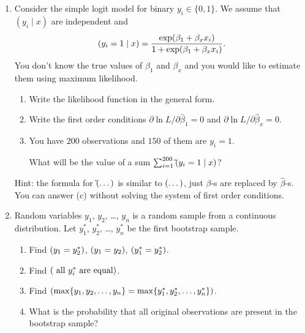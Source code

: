 \documentclass[12pt]{article}
\let\P\relax
\DeclareMathOperator{\P}{\mathbb{P}}
\begin{document}
\begin{enumerate}
    \item Consider the simple logit model for binary $y_i \in \{0, 1\}$.
    We assume that $(y_i \mid x)$ are independent and
    \[
    \P(y_i =1 \mid x) = \frac{\exp(\beta_1 + \beta_x x_i)}{1 + \exp(\beta_1 + \beta_x x_i)}.
    \]
    You don't know the true values of $\beta_1$ and $\beta_x$ and you would like to estimate them using maximum likelihood.
    \begin{enumerate}
        \item Write the likelihood function in the general form. 
        \item Write the first order conditions $\partial \ln L/\partial \hat\beta_1 = 0$ and $\partial \ln L/\partial \hat\beta_x = 0$.
        \item You have $200$ observations and $150$ of them are $y_i = 1$. 
        
        What will be the value of a sum $\sum_{i=1}^{200} \hat\P(y_i = 1\mid x)$?
    \end{enumerate}

    Hint: the formula for $\hat \P(\dots)$ is similar to $\P(\dots)$, just $\beta$-s are replaced by $\hat\beta$-s.
    You can answer (c) without solving the system of first order conditions. 

    \item Random variables $y_1$, $y_2$, \dots, $y_n$ is a random sample from a continuous distribution. 
    Let $y_1^*$, $y_2^*$, \dots, $y_n^*$ be the first bootstrap sample. 

    \begin{enumerate}
        \item Find $\P(y_1 = y_2^*)$, $\P(y_1 = y_2)$, $\P(y_1^* = y_2^*)$.
        \item Find $\P(\text{ all } y_i^* \text{ are equal})$.
        \item Find $\P(\max\{y_1, y_2, \dots, y_n\} = \max\{y_1^*, y_2^*, \dots, y_n^*\})$.
        \item What is the probability that all original observations are present in the bootstrap sample?
    \end{enumerate}
\end{enumerate}
\end{document}
